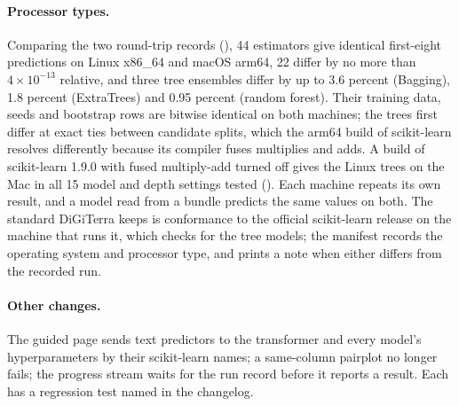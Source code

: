\paragraph{Processor types.} Comparing the two round-trip records (), 44 estimators give identical first-eight predictions on Linux x86\_64 and macOS arm64, 22 differ by no more than $4\times10^{-13}$ relative, and three tree ensembles differ by up to 3.6 percent (Bagging), 1.8 percent (ExtraTrees) and 0.95 percent (random forest). Their training data, seeds and bootstrap rows are bitwise identical on both machines; the trees first differ at exact ties between candidate splits, which the arm64 build of scikit-learn resolves differently because its compiler fuses multiplies and adds. A build of scikit-learn 1.9.0 with fused multiply-add turned off gives the Linux trees on the Mac in all 15 model and depth settings tested (). Each machine repeats its own result, and a model read from a bundle predicts the same values on both. The standard DiGiTerra keeps is conformance to the official scikit-learn release on the machine that runs it, which  checks for the tree models; the manifest records the operating system and processor type, and  prints a note when either differs from the recorded run.

\paragraph{Other changes.} The guided page sends text predictors to the transformer and every model's hyperparameters by their scikit-learn names; a same-column pairplot no longer fails; the progress stream waits for the run record before it reports a result. Each has a regression test named in the changelog.
